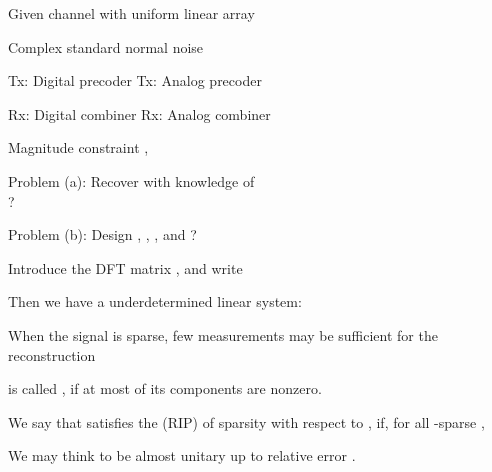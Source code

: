 {
\I Given channel  with uniform linear array

\I Complex standard normal noise 

\I Tx: Digital precoder 
\I Tx: Analog precoder 

\I Rx: Digital combiner 
\I Rx: Analog combiner 

\I Magnitude constraint ,  
}
{
\blank [big]

\I Problem (a): Recover  with knowledge of \\
?

\I Problem (b): Design , , , and ?
}
{
\I Introduce the DFT matrix , and write

\I Then we have a underdetermined linear system:

\I When the signal is sparse, few measurements may be sufficient for the reconstruction
}
{
\I {} is called , if at most  of its components are nonzero.

\I We say that  satisfies the  (RIP) of sparsity  with respect to , if, for all -sparse ,

\I We may think  to be almost unitary up to relative error .
}
